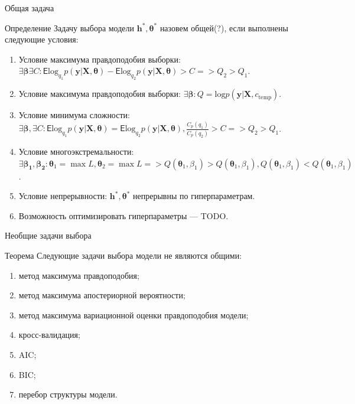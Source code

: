 \documentclass[usenames,dvipsnames,11pt,pdf,utf8,russian,aspectratio=43]{beamer}
\begin{document}
   
\begin{frame}{Общая задача}
\begin{block}{Определение}
Задачу выбора модели $\mathbf{h}^{*}, \boldsymbol{\theta}^{*}$ назовем общей(?), если выполнены следующие условия:
\begin{enumerate}
\item Условие максимума правдоподобия выборки: $\exists \boldsymbol{\beta} \exists C: \mathsf{E}\text{log}_{q_1} p(\mathbf{y}|\mathbf{X},\boldsymbol{\theta}) - \mathsf{E}\text{log}_{q_2} p(\mathbf{y}|\mathbf{X},\boldsymbol{\theta}) > C => Q_2 > Q_1.$
\item Условие максимума правдоподобия выборки: $\exists \boldsymbol{\beta}: Q = \text{log}p(\mathbf{y}|\mathbf{X}, c_\text{temp}).$
\item Условие минимума сложности: $\exists \boldsymbol{\beta}, \exists C: \mathsf{E}\text{log}_{q_1} p(\mathbf{y}|\mathbf{X},\boldsymbol{\theta}) = \mathsf{E}\text{log}_{q_2} p(\mathbf{y}|\mathbf{X},\boldsymbol{\theta}), \frac{C_p(q_1)}{C_p(q_2)}>C => Q_2>Q_1$.
\item Условие многоэкстремальности: $\exists \boldsymbol{\beta_1},\boldsymbol{\beta_2}: \boldsymbol{\theta}_1  = \max L, \boldsymbol{\theta}_2  = \max L => Q(\boldsymbol{\theta}_1, \beta_1) > Q(\boldsymbol{\theta}_1, \beta_1), Q(\boldsymbol{\theta}_1, \beta_1) < Q(\boldsymbol{\theta}_1, \beta_1)$.
\item Условие непрерывности: $\mathbf{h}^{*}, \boldsymbol{\theta}^{*}$ непрерывны по гиперпараметрам.
\item Возможность оптимизировать гиперпараметры --- TODO.
\end{enumerate}
\end{block}
\end{frame}
\begin{frame}{Необщие задачи выбора}
\begin{block}{Теорема}
Следующие задачи выбора модели не являются общими:
\begin{enumerate}
\item метод максимума правдоподобия;
\item метод максимума апостериорной вероятности;
\item метод максимума вариационной оценки правдоподобия модели;
\item кросс-валидация;
\item AIC;
\item BIC;
\item перебор структуры модели.
\end{enumerate}
\end{block}
\end{frame}
\end{document}

